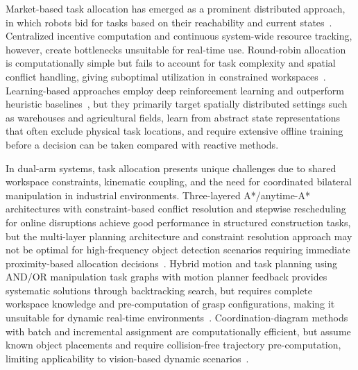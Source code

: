 Market-based task allocation has emerged as a prominent distributed approach, in which robots bid
for tasks based on their reachability and current
states~\citep{quinton2023market,alatartsev2015robotic}. Centralized incentive computation and
continuous system-wide resource tracking, however, create bottlenecks unsuitable for real-time use.
Round-robin allocation is computationally simple but fails to account for task complexity and
spatial conflict handling, giving suboptimal utilization in constrained
workspaces~\citep{korsah2013comprehensive}. Learning-based approaches employ deep reinforcement
learning and outperform heuristic baselines~\citep{ma2024end}, but they primarily target spatially
distributed settings such as warehouses and agricultural fields, learn from abstract state
representations that often exclude physical task locations, and require extensive offline training
before a decision can be taken compared with reactive methods.

In dual-arm systems, task allocation presents unique challenges due to shared workspace constraints,
kinematic coupling, and the need for coordinated bilateral manipulation in industrial environments.
Three-layered A*/anytime-A* architectures with constraint-based conflict resolution and stepwise
rescheduling for online disruptions achieve good performance in structured construction tasks, but
the multi-layer planning architecture and constraint resolution approach may not be optimal for
high-frequency object detection scenarios requiring immediate proximity-based allocation
decisions~\citep{hamasaki2023autonomous}. Hybrid motion and task planning using AND/OR manipulation
task graphs with motion planner feedback provides systematic solutions through backtracking search,
but requires complete workspace knowledge and pre-computation of grasp configurations, making it
unsuitable for dynamic real-time environments~\citep{rodriguez2016combining}. Coordination-diagram
methods with batch and incremental assignment are computationally efficient, but assume known object
placements and require collision-free trajectory pre-computation, limiting applicability to
vision-based dynamic scenarios~\citep{kimmel2016scheduling}.

